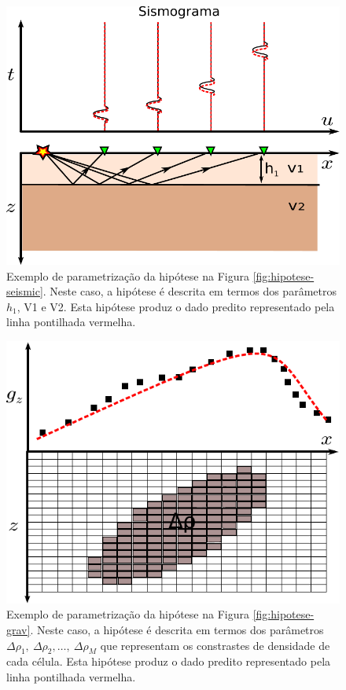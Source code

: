 \begin{figure}
    \centering
    \includegraphics[scale=0.7]{figs/params-seismic}
    \caption{Exemplo de parametrização da hipótese na Figura
    \ref{fig:hipotese-seismic}. Neste caso, a hipótese é descrita em termos
    dos parâmetros $h_1$, V1 e V2. Esta hipótese produz o dado predito
    representado pela linha pontilhada vermelha.}
    \label{fig:params-seismic}
\end{figure}

\begin{figure}
    \centering
    \includegraphics[scale=0.7]{figs/params-grav}
    \caption{Exemplo de parametrização da hipótese na Figura
    \ref{fig:hipotese-grav}. Neste caso, a hipótese é descrita em termos
    dos parâmetros $\Delta\rho_1,\ \Delta\rho_2, \dotsc,\ \Delta\rho_M$ que
    representam os constrastes de densidade de cada célula.
    Esta hipótese produz o dado predito
    representado pela linha pontilhada vermelha.}
    \label{fig:params-grav}
\end{figure}

